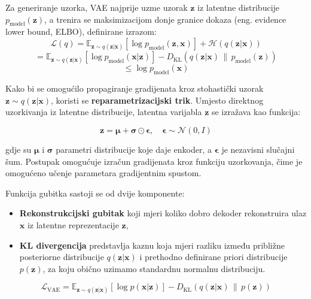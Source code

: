 \documentclass[times, utf8, seminar, numeric]{fer}
\begin{document}
		Za generiranje uzorka, VAE najprije uzme uzorak $\bm{z}$ iz latentne distribucije $p_{\text{model}}(\mathbf{z})$, a trenira se maksimizacijom donje granice dokaza (eng. evidence lower bound, ELBO), definirane izrazom:
		\begin{equation}
			\mathcal{L}(q) = \mathbb{E}_{\mathbf{z} \sim q(\mathbf{z}|\mathbf{x})} \left[ \log p_{\text{model}}(\mathbf{z}, \mathbf{x}) \right] + \mathcal{H}(q(\mathbf{z}|\mathbf{x}))
			\tag{2.4.1}
		\end{equation}
		\begin{equation}
			= \mathbb{E}_{\mathbf{z} \sim q(\mathbf{z}|\mathbf{x})} \left[ \log p_{\text{model}}(\mathbf{x} | \mathbf{z}) \right] - D_{\text{KL}} \left( q(\mathbf{z}|\mathbf{x}) \,\|\, p_{\text{model}}(\mathbf{z}) \right)
			\tag{2.4.2}
		\end{equation}
		\begin{equation}
			\leq \log p_{\text{model}}(\mathbf{x})
			\tag{2.4.3}
		\end{equation}
		
		Kako bi se omogućilo propagiranje gradijenata kroz stohastički uzorak $\mathbf{z} \sim q(\mathbf{z}|\mathbf{x})$, koristi se \textbf{reparametrizacijski trik}. Umjesto direktnog uzorkivanja iz latentne distribucije, latentna varijabla $\mathbf{z}$ se izražava kao funkcija:
		
		\[
		\mathbf{z} = \bm{\mu} + \bm{\sigma} \odot \bm{\epsilon}, \quad \bm{\epsilon} \sim \mathcal{N}(0, I)
		\]
		
		gdje su $\bm{\mu}$ i $\bm{\sigma}$ parametri distribucije koje daje enkoder, a $\bm{\epsilon}$ je nezavisni slučajni šum. Postupak omogućuje izračun gradijenata kroz funkciju uzorkovanja, čime je omogućeno učenje parametara gradijentnim spustom.
		
		Funkcija gubitka sastoji se od dvije komponente:
		\begin{itemize}
			\item \textbf{Rekonstrukcijski gubitak} koji mjeri koliko dobro dekoder rekonstruira ulaz $\mathbf{x}$ iz latentne reprezentacije $\mathbf{z}$,
			\item \textbf{KL divergencija} predstavlja kaznu koja mjeri razliku između približne posteriorne distribucije $q(\mathbf{z}|\mathbf{x})$ i prethodno definirane priori distribucije $p(\mathbf{z})$, za koju obično uzimamo standardnu normalnu distribuciju.
		\end{itemize}
		
		\[
		\mathcal{L}_{\text{VAE}} = \mathbb{E}_{\mathbf{z} \sim q(\mathbf{z}|\mathbf{x})} \left[ \log p(\mathbf{x}|\mathbf{z}) \right] - D_{\text{KL}} \left( q(\mathbf{z}|\mathbf{x}) \,\|\, p(\mathbf{z}) \right)
		\]
		
\end{document}
